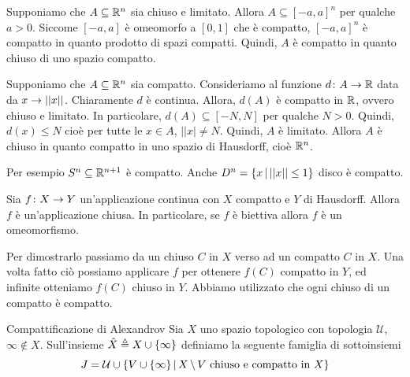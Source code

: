 \documentclass[a4paper]{article}
\begin{document}
\begin{snippetproof}{}
    \begin{ffiproof}
        \item Supponiamo che \(A \subseteq \mathbb{R}^n\) sia chiuso e limitato.
        Allora \(A \subseteq [-a, a]^n\) per qualche \(a>0\).
        Siccome \([-a, a]\) è omeomorfo a \([0,1]\) che è compatto,
        \([-a, a]^n\) è compatto in quanto prodotto di spazi compatti.
        Quindi, \(A\) è compatto in quanto chiuso di uno spazio compatto.
        \item Supponiamo che \(A \subseteq \mathbb{R}^n\) sia
        compatto. Consideriamo al funzione
        \(d \colon A \to \mathbb{R}\) data da \(x\to ||x||\).
        Chiaramente \(d\) è continua.
        Allora, \(d(A)\) è compatto in \(\mathbb{R}\), ovvero chiuso e limitato.
        In particolare, \(d(A) \subseteq [-N, N]\) per qualche \(N >0\).
        Quindi, \(d(x) \leq N\) cioè per tutte le \(x\in A\), \(||x| \neq N\).
        Quindi, \(A\) è limitato.
        Allora \(A\) è chiuso in quanto compatto in uno spazio di Hausdorff, cioè
        \(\mathbb{R}^n\).
    \end{ffiproof}
\end{snippetproof}

Per esempio \(S^n \subseteq \mathbb{R}^{n+1}\) è compatto.
Anche \(D^n = \{x \,|\, ||x||\leq 1\}\) disco è compatto.

\begin{snippetcorollary}{}
    Sia \(f\colon X \to Y\) un'applicazione continua con \(X\) compatto
    e \(Y\) di Hausdorff. Allora \(f\) è un'applicazione chiusa.
    In particolare, se \(f\) è biettiva allora \(f\) è un omeomorfismo.
\end{snippetcorollary}

\begin{snippetproof}{}
    Per dimostrarlo passiamo da un chiuso \(C\) in \(X\) verso ad un compatto
    \(C\) in \(X\). Una volta fatto ciò possiamo applicare \(f\) per ottenere \(f(C)\) compatto in \(Y\),
    ed infinite otteniamo \(f(C)\) chiuso in \(Y\).
    Abbiamo utilizzato che ogni chiuso di un compatto è compatto.
\end{snippetproof}

\begin{snippetdefinition}{Compattificazione di Alexandrov}
    Sia \(X\) uno spazio topologico con topologia \(\mathcal U\), \(\infty \notin X\).
    Sull'insieme \(\hat{X} \triangleq X \cup \{\infty\}\)
    definiamo la seguente famiglia di sottoinsiemi
    \[
        J = \mathcal U
        \cup \{V \cup \{\infty\} \,|\, X \,\backslash\, V \text{ chiuso e compatto in } X\}
    \]
\end{snippetdefinition}
\end{document}
